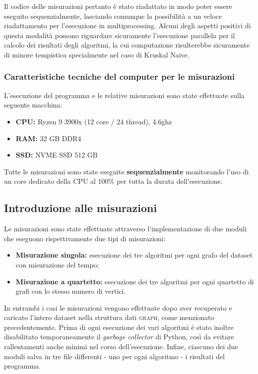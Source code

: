 Il codice delle misurazioni pertanto è stato riadattato in modo poter essere eseguito sequenzialmente, lasciando comunque la possibilità a un veloce riadattamento per l'esecuzione in multiprocessing. Alcuni degli aspetti positivi di questa modalità possono riguardare sicuramente l'esecuzione parallela per il calcolo dei risultati degli algoritmi, la cui computazione risulterebbe sicuramente di minore tempistica specialmente nel caso di Kruskal Naive.   

\subsubsection{Caratteristiche tecniche del computer per le misurazioni} %

L'esecuzione del programma e le relative misurazioni sono state effettuate sulla seguente macchina:
\begin{itemize}
    \item \textbf{CPU:} Ryzen 9 3900x (12 core / 24 thread), 4.6ghz
    \item \textbf{RAM:} 32 GB DDR4
    \item \textbf{SSD:} NVME SSD 512 GB
\end{itemize}

\noindent Tutte le misurazioni sono state eseguite \textbf{sequenzialmente} monitorando l'uso di un core dedicato della CPU al 100\% per tutta la durata dell'esecuzione.


\subsection{Introduzione alle misurazioni} 

Le misurazioni sono state effettuate attraverso l'implementazione di due moduli che eseguono rispettivamente due tipi di misurazioni:

\begin{itemize}
    \item \textbf{Misurazione singola:} esecuzione dei tre algoritmi per ogni grafo del dataset con misurazione del tempo;
    \item \textbf{Misurazione a quartetto:} esecuzione dei tre algoritmi per ogni quartetto di grafi con lo stesso numero di vertici.
\end{itemize}

In entrambi i casi le misurazioni vengono effettuate dopo aver recuperato e caricato l'intero dataset nella struttura dati \textsc{graph}, come menzionato precedentemente.
Prima di ogni esecuzione dei vari algoritmi è stato inoltre disabilitato temporaneamente il \textit{garbage collector} di Python, così da evitare rallentamenti anche minimi nel corso dell'esecuzione. Infine, ciascuno dei due moduli salva in tre file differenti - uno per ogni algoritmo - i risultati del programma.


